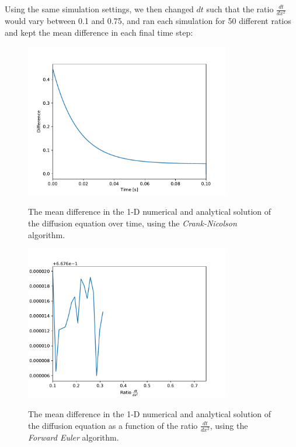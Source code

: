 \documentclass[a4paper,10pt,english]{article}
\begin{document}
Using the same simulation settings, we then changed $dt$ such that the ratio $\frac{dt}{dx^2}$ would vary between 0.1 and 0.75, and ran each simulation for 50 different ratios and kept the mean difference in each final time step:

\begin{figure}[H]
 \centering
  {\includegraphics[width=0.8\textwidth]{fig1_crank.pdf}}
  \caption{The mean difference in the 1-D numerical and analytical solution of the diffusion equation over time, using the \textit{Crank-Nicolson} algorithm.\label{fig_7}}
\end{figure}

\begin{figure}[H]
 \centering
  {\includegraphics[width=0.8\textwidth]{fig2_fwd.pdf}}
  \caption{The mean difference in the 1-D numerical and analytical solution of the diffusion equation as a function of the ratio $\frac{dt}{dx^2}$, using the \textit{Forward Euler} algorithm.\label{fig_8}}
\end{figure}
\end{document}
